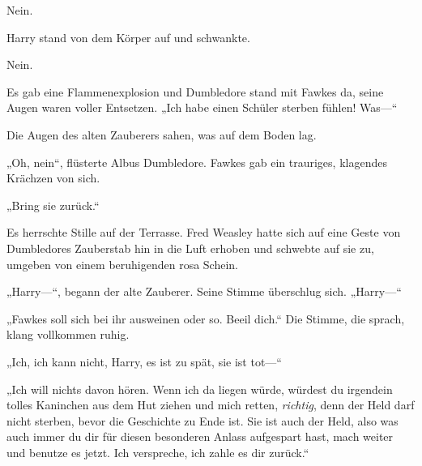 Nein.

Harry stand von dem Körper auf und schwankte.

Nein.

Es gab eine Flammenexplosion und Dumbledore stand mit Fawkes da, seine Augen waren voller Entsetzen. „Ich habe einen Schüler sterben fühlen! Was—“

Die Augen des alten Zauberers sahen, was auf dem Boden lag.

„Oh, nein“, flüsterte Albus Dumbledore. Fawkes gab ein trauriges, klagendes Krächzen von sich.

„Bring sie zurück.“

Es herrschte Stille auf der Terrasse. Fred Weasley hatte sich auf eine Geste von Dumbledores Zauberstab hin in die Luft erhoben und schwebte auf sie zu, umgeben von einem beruhigenden rosa Schein.

„Harry—“, begann der alte Zauberer. Seine Stimme überschlug sich. „Harry—“

„Fawkes soll sich bei ihr ausweinen oder so. Beeil dich.“
Die Stimme, die sprach, klang vollkommen ruhig.

„Ich, ich kann nicht, Harry, es ist zu spät, sie ist tot—“

„Ich will nichts davon hören. Wenn ich da liegen würde, würdest du irgendein tolles Kaninchen aus dem Hut ziehen und mich retten, \emph{richtig}, denn der Held darf nicht sterben, bevor die Geschichte zu Ende ist. Sie ist auch der Held, also was auch immer du dir für diesen besonderen Anlass aufgespart hast, mach weiter und benutze es jetzt. Ich verspreche, ich zahle es dir zurück.“

